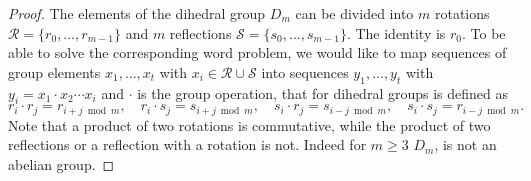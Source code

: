 \documentclass{article} %
\begin{document}
\begin{proof}
The elements of the dihedral group $D_m$ can be divided into $m$ rotations $\mathcal{R} =\{r_0, \dots, r_{m-1}\}$ and $m$ reflections $\mathcal{S} =\{s_0, \dots, s_{m-1}\}$. The identity is $r_0$. To be able to solve the corresponding word problem, we would like to map sequences of group elements $x_1,\dots, x_t$ with $x_i \in \mathcal{R}\cup\mathcal{S}$ into sequences $y_1,\dots, y_t$ with $y_i = x_1 \cdot x_2 \cdots x_i$ and $\cdot$ is the group operation, that for dihedral groups is defined as
\begin{equation}\label{eq:groupop}
    r_i \cdot r_j=r_{i+j \bmod m}, \quad r_i \cdot s_j=s_{i+j \bmod m}, \quad s_i \cdot r_j=s_{i-j \bmod m}, \quad s_i \cdot s_j=r_{i-j \bmod m}.
\end{equation}
Note that a product of two rotations is commutative, while the product of two reflections or a reflection with a rotation is not. Indeed for $m \geq 3$ $D_m$, is not an abelian group.


\end{proof}
\end{document}

